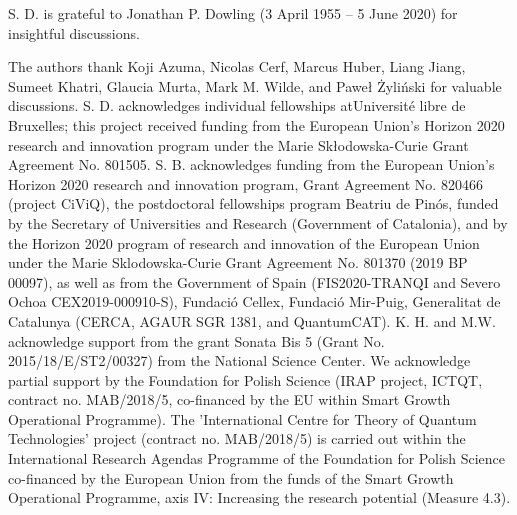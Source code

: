 \documentclass[aps,pra,twocolumn,superscriptaddress,longbibliography]{revtex4-1}
\begin{document}
\begin{acknowledgments}

S. D. is grateful to Jonathan P. Dowling (3 April 1955 – 5 June 2020) for insightful discussions.

The authors thank Koji Azuma, Nicolas Cerf, Marcus Huber, Liang Jiang, Sumeet Khatri, Glaucia Murta, Mark M. Wilde, and Paweł Żyliński for valuable discussions. S. D. acknowledges individual fellowships atUniversit\'{e} libre de Bruxelles; this project received funding from the European Union’s Horizon 2020 research and innovation program under the Marie Skłodowska-Curie Grant Agreement No. 801505. S. B. acknowledges funding from the European Union’s Horizon 2020 research and innovation program, Grant Agreement No. 820466 (project CiViQ), the postdoctoral fellowships program Beatriu de Pinós, funded by the Secretary of Universities and Research (Government of Catalonia), and by the Horizon 2020 program of research and innovation of the European Union under the Marie Sklodowska-Curie Grant Agreement No. 801370 (2019 BP 00097), as well as from the Government of Spain (FIS2020-TRANQI and Severo Ochoa CEX2019-000910-S), Fundació Cellex, Fundació Mir-Puig, Generalitat de Catalunya (CERCA, AGAUR SGR 1381, and QuantumCAT). K. H. and M.W. acknowledge support from the grant Sonata Bis 5 (Grant No. 2015/18/E/ST2/00327) from the National Science Center. We acknowledge partial support by the Foundation for Polish Science (IRAP project, ICTQT, contract no. MAB/2018/5, co-financed by the EU within Smart Growth Operational Programme). The ’International Centre for Theory of Quantum Technologies’ project (contract no. MAB/2018/5) is carried out within the International Research Agendas Programme of the Foundation for Polish Science co-financed by the European Union from the funds of the Smart Growth Operational Programme, axis IV: Increasing the research potential (Measure 4.3).





\end{acknowledgments}
\end{document}
